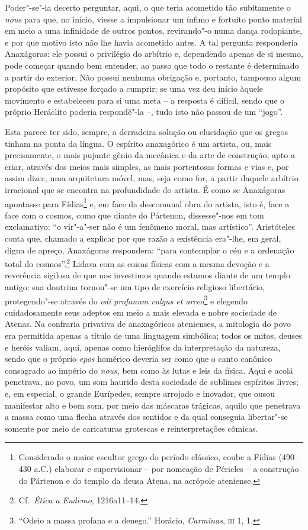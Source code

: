 \sectionitem

Poder"-se"-ia decerto perguntar, aqui, o que teria acometido tão
subitamente o \textit{nous} para que, no início, viesse a impulsionar
um ínfimo e fortuito ponto material em meio a uma infinidade de outros
pontos, revirando"-o numa dança rodopiante, e por que motivo isto não
lhe havia acometido antes. A tal pergunta responderia Anaxágoras: ele
possui o privilégio do arbítrio e, dependendo apenas de si mesmo, pode
começar quando bem entender, ao passo que todo o restante é determinado
a partir do exterior. Não possui nenhuma obrigação e, portanto,		\label{naopossuinenhuma}
tampouco algum propósito que estivesse forçado a cumprir; se uma vez
deu início àquele movimento e estabeleceu para si uma meta -- a resposta
é difícil, sendo que o próprio Heráclito poderia respondê"-la --, tudo
isto não passou de um ``jogo''.

 Esta parece ter sido, sempre, a derradeira solução ou elucidação que os
gregos tinham na ponta da língua. O espírito anaxagórico é um artista,
ou, mais precisamente, o mais pujante gênio da mecânica e da arte de
construção, apto a criar, através dos meios mais simples, as mais
portentosas formas e vias e, por assim dizer, uma arquitetura
móvel, mas, seja como for, a partir daquele arbítrio irracional que se
encontra na profundidade do artista. É como se Anaxágoras apontasse
para Fídias\footnote{ Considerado o maior escultor grego do período
clássico, coube a Fídias (490--430 a.C.) elaborar e supervisionar -- 
por nomeação de Péricles -- a construção do Pártenon e do templo da
deusa Atena, na acrópole ateniense.} e, em face da descomunal
obra do artista, isto é, face a face com o cosmos, como que diante do
Pártenon, dissesse"-nos em tom exclamativo: ``o vir"-a"-ser não é um
fenômeno moral, mas artístico''. Aristóteles conta que, chamado a
explicar por que razão a existência era"-lhe, em geral, digna de apreço,
Anaxágoras respondera: ``para contemplar o céu e a ordenação total
do cosmos''.\footnote{ Cf.~\textit{Ética a Eudemo}, 1216a11--14.} 
Lidava com as coisas físicas com a mesma devoção e a reverência
sigilosa de que nos investimos quando estamos diante de um templo
antigo; sua doutrina tornou"-se um tipo de exercício religioso
libertário, protegendo"-se através do \textit{odi profanum vulgus et
arceo}\footnote{ ``Odeio a massa profana e a denego.'' Horácio,
\textit{Carminas}, \textsc{iii} 1, 1.} e elegendo cuidadosamente seus
adeptos em meio a mais elevada e nobre sociedade de Atenas. Na
confraria privativa de anaxagóricos atenienses, a mitologia do povo era
permitida apenas a título de uma linguagem simbólica; todos os mitos,
deuses e heróis valiam, aqui, apenas como hieróglifos da interpretação
da natureza, sendo que o próprio \textit{epos} homérico deveria ser como que o
canto canônico consagrado ao império do \textit{nous}, bem como às
lutas e leis da física. Aqui e acolá penetrava, no povo, um som haurido
desta sociedade de sublimes espíritos livres; e, em especial, o grande
Eurípedes, sempre arrojado e inovador, que ousou manifestar alto e bom
som, por meio das máscaras trágicas, aquilo que penetrava a massa como
uma flecha através dos sentidos e da qual conseguia libertar"-se somente
por meio de caricaturas grotescas e reinterpretações cômicas.

